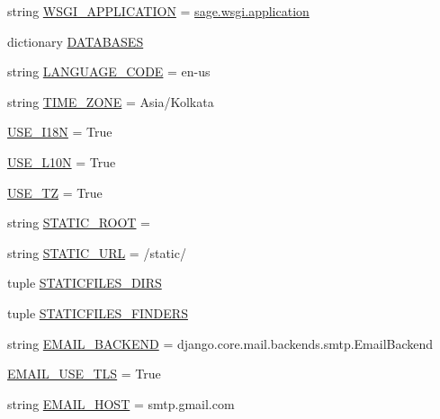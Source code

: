 \begin{DoxyCompactItemize}
\item 
string \hyperlink{namespacesage_1_1settings_a700b653427cc28bc1ebe951b419cfd58}{W\+S\+G\+I\+\_\+\+A\+P\+P\+L\+I\+C\+A\+T\+I\+O\+N} = \textquotesingle{}\hyperlink{namespacesage_1_1wsgi_a1ddb23bace7377dbda42c61a804bb9aa}{sage.\+wsgi.\+application}\textquotesingle{}
\item 
dictionary \hyperlink{namespacesage_1_1settings_a870c10acdd1141ac92340ce3e50ffbbd}{D\+A\+T\+A\+B\+A\+S\+E\+S}
\item 
string \hyperlink{namespacesage_1_1settings_ac5b7a49ef37a25508ecb84453063821a}{L\+A\+N\+G\+U\+A\+G\+E\+\_\+\+C\+O\+D\+E} = \textquotesingle{}en-\/us\textquotesingle{}
\item 
string \hyperlink{namespacesage_1_1settings_a07421ef620becc4c93753901abdf83c0}{T\+I\+M\+E\+\_\+\+Z\+O\+N\+E} = \textquotesingle{}Asia/Kolkata\textquotesingle{}
\item 
\hyperlink{namespacesage_1_1settings_acf5dd02a352695a98f57bef7679a29af}{U\+S\+E\+\_\+\+I18\+N} = True
\item 
\hyperlink{namespacesage_1_1settings_a9d0e7298d4688c99e0ee9e965d950de0}{U\+S\+E\+\_\+\+L10\+N} = True
\item 
\hyperlink{namespacesage_1_1settings_aa385f778cd7bd79cc4c688fec7c101a2}{U\+S\+E\+\_\+\+T\+Z} = True
\item 
string \hyperlink{namespacesage_1_1settings_a91b967847aecdd4d0edfbb0229656929}{S\+T\+A\+T\+I\+C\+\_\+\+R\+O\+O\+T} = \textquotesingle{}\textquotesingle{}
\item 
string \hyperlink{namespacesage_1_1settings_a0b4647cdde23eaed09c255182a9f576c}{S\+T\+A\+T\+I\+C\+\_\+\+U\+R\+L} = \textquotesingle{}/static/\textquotesingle{}
\item 
tuple \hyperlink{namespacesage_1_1settings_ac4ae870dea0d58410747ddcbdff2b3d7}{S\+T\+A\+T\+I\+C\+F\+I\+L\+E\+S\+\_\+\+D\+I\+R\+S}
\item 
tuple \hyperlink{namespacesage_1_1settings_af629022b1da961fa9828f450bc80bd22}{S\+T\+A\+T\+I\+C\+F\+I\+L\+E\+S\+\_\+\+F\+I\+N\+D\+E\+R\+S}
\item 
string \hyperlink{namespacesage_1_1settings_a2d83ca0a279480aa03599465a0386b17}{E\+M\+A\+I\+L\+\_\+\+B\+A\+C\+K\+E\+N\+D} = \textquotesingle{}django.\+core.\+mail.\+backends.\+smtp.\+Email\+Backend\textquotesingle{}
\item 
\hyperlink{namespacesage_1_1settings_a0fe7c4174cb1b7d03f7b574ae1e5eed9}{E\+M\+A\+I\+L\+\_\+\+U\+S\+E\+\_\+\+T\+L\+S} = True
\item 
string \hyperlink{namespacesage_1_1settings_a594329fe15c9680f523afaab779411ed}{E\+M\+A\+I\+L\+\_\+\+H\+O\+S\+T} = \textquotesingle{}smtp.\+gmail.\+com\textquotesingle{}

\end{DoxyCompactItemize}
